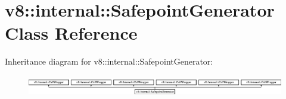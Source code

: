 \hypertarget{classv8_1_1internal_1_1_safepoint_generator}{}\section{v8\+:\+:internal\+:\+:Safepoint\+Generator Class Reference}
\label{classv8_1_1internal_1_1_safepoint_generator}
Inheritance diagram for v8\+:\+:internal\+:\+:Safepoint\+Generator\+:\begin{figure}[H]
\begin{center}
\leavevmode
\includegraphics[height=0.942761cm]{classv8_1_1internal_1_1_safepoint_generator}
\end{center}
\end{figure}

